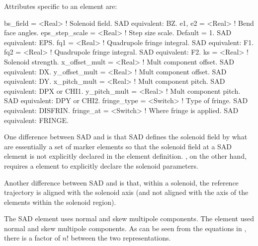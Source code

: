 {
Attributes specific to an  element are:
\begin{example}
  bs_field        = <Real>    ! Solenoid field. SAD equivalent: BZ.
  e1, e2          = <Real>    ! Bend face angles.
  eps_step_scale  = <Real>    ! Step size scale. Default = 1. SAD equivalent: EPS.
  fq1             = <Real>    ! Quadrupole fringe integral. SAD equivalent: F1.
  fq2             = <Real>    ! Quadrupole fringe integral. SAD equivalent: F2.
  ks              = <Real>    ! Solenoid strength. 
  x_offset_mult   = <Real>    ! Mult component offset. SAD equivalent: DX.
  y_offset_mult   = <Real>    ! Mult component offset. SAD equivalent: DY.
  x_pitch_mult    = <Real>    ! Mult component pitch. SAD equivalent: DPX or CHI1.
  y_pitch_mult    = <Real>    ! Mult component pitch. SAD equivalent: DPY or CHI2.
  fringe_type     = <Switch>  ! Type of fringe. SAD equivalent: DISFRIN.
  fringe_at       = <Switch>  ! Where fringe is applied. SAD equivalent: FRINGE.
\end{example}


One difference between SAD and \bmad is that SAD defines the solenoid
field by what are essentially a set of marker elements so that the
solenoid field at a SAD  element is not explicitly declared
in the  element definition. \bmad, on the other hand,
requires a  element to explicitly declare the solenoid
parameters.

Another difference between SAD and \bmad is that, within a solenoid,
the reference trajectory is aligned with the solenoid axis (and not
aligned with the axis of the elements within the solenoid region).

The SAD  element uses normal  and skew 
multipole components. The \bmad {} element used normal
 and skew  multipole components. As can be seen from the
equations in , there is a factor of $n!$ between the
two representations.

}

